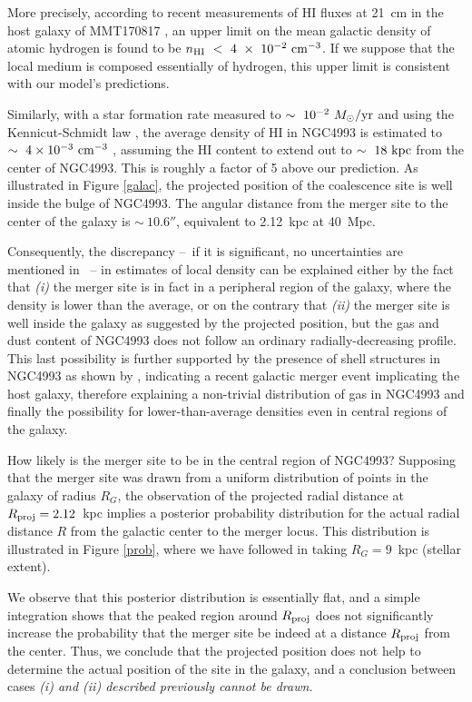 More precisely, according to recent measurements of HI fluxes at 21~cm in the host galaxy of MMT170817 \citep{12}, an upper limit on the mean galactic density of atomic hydrogen is found to be $n_{\rm{HI}}~<~4~\times~10^{-2}~\rm{cm}^{-3}$. If we suppose that the local medium is composed essentially of hydrogen, this upper limit is consistent with our model's predictions.

Similarly, with a star formation rate measured to $\sim~10^{-2}~\Ms/\rm{yr}$ \citep{9} and using the Kennicut-Schmidt law  \citep{43}, the average density of HI in NGC4993 is estimated to $\sim~4 \times 10^{-3}~\rm{cm}^{-3}$ \citep{12}, assuming the HI content to extend out to $\sim~18~\rm{kpc}$ from the center of NGC4993. This is roughly a factor of 5 above our prediction. As illustrated in Figure \ref{galac}, the projected position of the coalescence site is well inside the bulge of NGC4993. The angular distance from the merger site to the center of the galaxy is $\sim~10.6''$, equivalent to 2.12~kpc at 40~Mpc.

Consequently, the discrepancy --~if it is significant, no uncertainties are mentioned in \citet{12}~-- in estimates of local density can be explained either by the fact that \textit{(i)} the merger site is in fact in a peripheral region of the galaxy, where the density is lower than the average, or on the contrary that \textit{(ii)} the merger site is well inside the galaxy as suggested by the projected position, but the gas and dust content of NGC4993 does not follow an ordinary radially-decreasing profile. This last possibility is further supported by the presence of shell structures in NGC4993 as shown by \citet{33}, indicating a recent galactic merger event implicating the host galaxy, therefore explaining a non-trivial distribution of gas in NGC4993 and finally the possibility for lower-than-average densities even in central regions of the galaxy.

How likely is the merger site to be in the central region of NGC4993? Supposing that the merger site was drawn from a uniform distribution of points in the galaxy of radius $R_G$, the observation of the projected radial distance at $R_\rm{proj} = 2.12$~kpc implies a posterior probability distribution for the actual radial distance $R$ from the galactic center to the merger locus. This distribution is illustrated in Figure \ref{prob}, where we have followed \citet{12} in taking $R_G = 9$~kpc (stellar extent).

We observe that this posterior distribution is essentially flat, and a simple integration shows that the peaked region around $R_\rm{proj}$ does not significantly increase the probability that the merger site be indeed at a distance $R_\rm{proj}$ from the center. Thus, we conclude that the projected position does not help to determine the actual position of the site in the galaxy, and a conclusion between cases \it{(i)} and \it{(ii)} described previously cannot be drawn.

